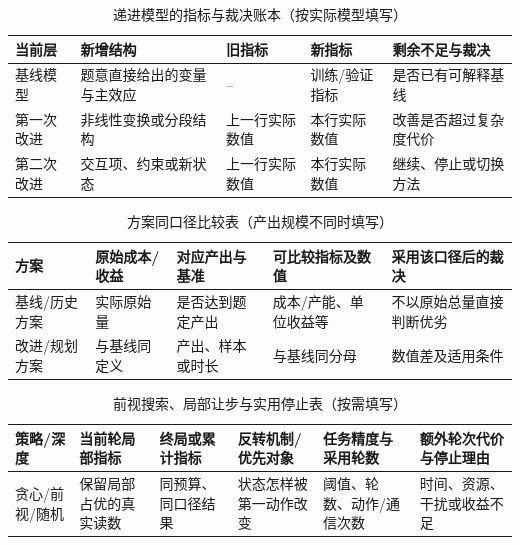 \documentclass[withoutpreface,bwprint]{cumcmthesis}
\newif\ifmcmguidance
\begin{document}
\ifmcmguidance
  \begin{table}[H]
    \centering
    \small
    \caption{递进模型的指标与裁决账本（按实际模型填写）}
    \label{tab:progressive-model-guide}
    \begin{tabular}{p{2.2cm}p{3.0cm}p{2.2cm}p{2.2cm}p{3.2cm}}
      \toprule
      当前层 & 新增结构 & 旧指标 & 新指标 & 剩余不足与裁决 \\
      \midrule
      基线模型 & 题意直接给出的变量与主效应 & -- & 训练/验证指标 & 是否已有可解释基线 \\
      第一次改进 & 非线性变换或分段结构 & 上一行实际数值 & 本行实际数值 & 改善是否超过复杂度代价 \\
      第二次改进 & 交互项、约束或新状态 & 上一行实际数值 & 本行实际数值 & 继续、停止或切换方法 \\
      \bottomrule
    \end{tabular}
  \end{table}
  \begin{table}[H]
    \centering
    \small
    \caption{方案同口径比较表（产出规模不同时填写）}
    \label{tab:comparable-denominator-guide}
    \begin{tabular}{p{2.15cm}p{2.4cm}p{2.35cm}p{2.7cm}p{3.45cm}}
      \toprule
      方案 & 原始成本/收益 & 对应产出与基准 & 可比较指标及数值 & 采用该口径后的裁决 \\
      \midrule
      基线/历史方案 & 实际原始量 & 是否达到题定产出 & 成本/产能、单位收益等 & 不以原始总量直接判断优劣 \\
      改进/规划方案 & 与基线同定义 & 产出、样本或时长 & 与基线同分母 & 数值差及适用条件 \\
      \bottomrule
    \end{tabular}
  \end{table}
  \begin{table}[H]
    \centering
    \small
    \caption{前视搜索、局部让步与实用停止表（按需填写）}
    \label{tab:lookahead-practical-stop-guide}
    \begin{tabular}{p{1.65cm}p{2.05cm}p{2.2cm}p{2.4cm}p{2.25cm}p{2.35cm}}
      \toprule
      策略/深度 & 当前轮局部指标 & 终局或累计指标 & 反转机制/优先对象 & 任务精度与采用轮数 & 额外轮次代价与停止理由 \\
      \midrule
      贪心/前视/随机 & 保留局部占优的真实读数 & 同预算、同口径结果 & 状态怎样被第一动作改变 & 阈值、轮数、动作/通信次数 & 时间、资源、干扰或收益不足 \\
      \bottomrule
    \end{tabular}
  \end{table}
\end{document}
